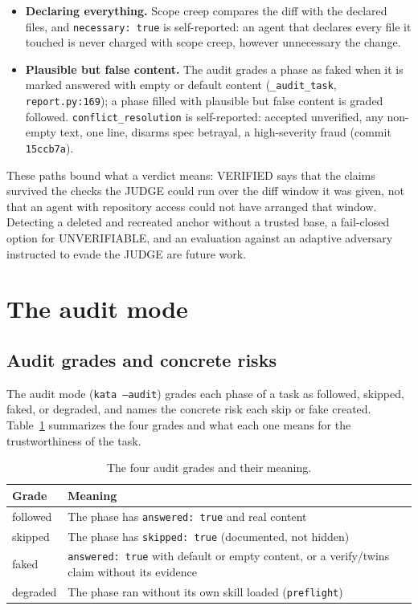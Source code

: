 \documentclass[11pt]{article}
\begin{document}
\begin{itemize}
unprobed languages are not failed wholesale. An agent can exploit it: a
weakened test hidden with \texttt{.git/info/exclude} (s19) or written in an
unprobed language (s12) yields UNVERIFIABLE and passes a gate that reads only
the exit code.
\item \textbf{Declaring everything.} Scope creep compares the diff with the
declared files, and \texttt{necessary: true} is self-reported: an agent that
declares every file it touched is never charged with scope creep, however
unnecessary the change.
\item \textbf{Plausible but false content.} The audit grades a phase as faked
when it is marked answered with empty or default content
(\texttt{\_audit\_task}, \texttt{report.py:169}); a phase filled with
plausible but false content is graded followed. \texttt{conflict\_resolution} is self-reported: accepted unverified, any non-empty
text, one line, disarms spec betrayal, a high-severity fraud
(commit \texttt{15ccb7a}).
\end{itemize}

These paths bound what a verdict means: VERIFIED says that the claims
survived the checks the JUDGE could run over the diff window it was given,
not that an agent with repository access could not have arranged that
window. Detecting a deleted and recreated anchor without a trusted base, a
fail-closed option for UNVERIFIABLE, and an evaluation against an
adaptive adversary instructed to evade the JUDGE are future work.

\section{The audit mode}
\label{sec:audit}

\subsection{Audit grades and concrete risks}

The audit mode (\texttt{kata --audit}) grades each phase of a task as
followed, skipped, faked, or degraded, and names the concrete risk each
skip or fake created. Table~\ref{tab:grades} summarizes the four grades
and what each one means for the trustworthiness of the task.

\begin{table}[!ht]
\caption{The four audit grades and their meaning.}
\centering
\begin{tabular}{@{}lp{9cm}@{}}
\toprule
Grade & Meaning \\
\midrule
followed & The phase has \texttt{answered: true} and real content \\
skipped & The phase has \texttt{skipped: true} (documented, not hidden) \\
faked & \texttt{answered: true} with default or empty content, or a verify/twins claim without its evidence \\
degraded & The phase ran without its own skill loaded (\texttt{preflight}) \\
\bottomrule
\end{tabular}
\label{tab:grades}
\end{table}
\end{document}
